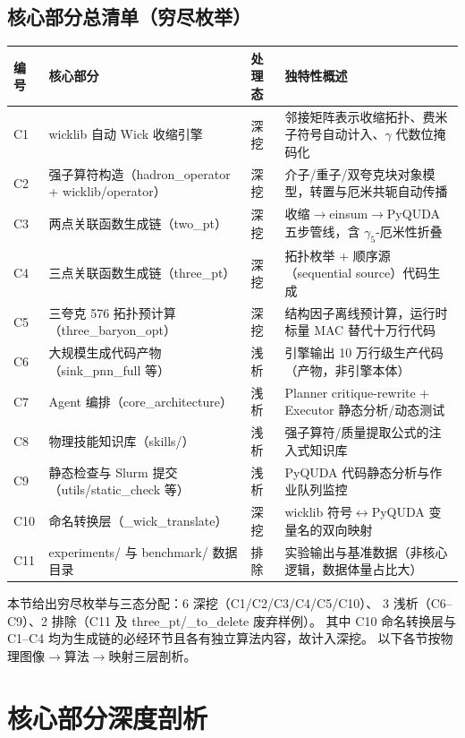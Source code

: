 \documentclass[UTF8]{ctexart}
\begin{document}
\subsection{核心部分总清单（穷尽枚举）}
\begin{xltabular}{\textwidth}{lllX}
\toprule
\textcolor{algo}{编号} & 核心部分 & 处理态 & 独特性概述 \\
\midrule
\endhead
C1 & wicklib 自动 Wick 收缩引擎 & 深挖 & 邻接矩阵表示收缩拓扑、费米子符号自动计入、$\gamma$ 代数位掩码化 \\
C2 & 强子算符构造（hadron\_operator + wicklib/operator） & 深挖 & 介子/重子/双夸克块对象模型，转置与厄米共轭自动传播 \\
C3 & 两点关联函数生成链（two\_pt） & 深挖 & 收缩$\to$einsum$\to$PyQUDA 五步管线，含 $\gamma_5$-厄米性折叠 \\
C4 & 三点关联函数生成链（three\_pt） & 深挖 & 拓扑枚举 + 顺序源（sequential source）代码生成 \\
C5 & 三夸克 576 拓扑预计算（three\_baryon\_opt） & 深挖 & 结构因子离线预计算，运行时标量 MAC 替代十万行代码 \\
C6 & 大规模生成代码产物（sink\_pnn\_full 等） & 浅析 & 引擎输出 10 万行级生产代码（产物，非引擎本体） \\
C7 & Agent 编排（core\_architecture） & 浅析 & Planner critique-rewrite + Executor 静态分析/动态测试 \\
C8 & 物理技能知识库（skills/） & 浅析 & 强子算符/质量提取公式的注入式知识库 \\
C9 & 静态检查与 Slurm 提交（utils/static\_check 等） & 浅析 & PyQUDA 代码静态分析与作业队列监控 \\
C10 & 命名转换层（\_wick\_translate） & 深挖 & wicklib 符号$\leftrightarrow$PyQUDA 变量名的双向映射 \\
C11 & experiments/ 与 benchmark/ 数据目录 & 排除 & 实验输出与基准数据（非核心逻辑，数据体量占比大） \\
\bottomrule
\end{xltabular}

本节给出穷尽枚举与三态分配：\textcolor{algo}{6 深挖}（C1/C2/C3/C4/C5/C10）、
3 浅析（C6--C9）、2 排除（C11 及 three\_pt/\_to\_delete 废弃样例）。
其中 C10 命名转换层与 C1--C4 均为生成链的必经环节且各有独立算法内容，故计入深挖。
以下各节按物理图像$\to$算法$\to$映射三层剖析。

\section{核心部分深度剖析}
\end{document}
